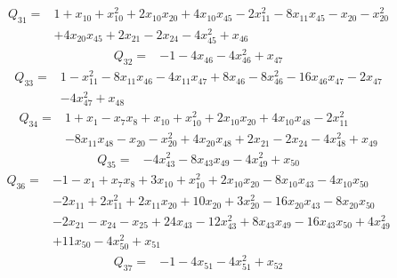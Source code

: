 \begin{equation*}\begin{aligned}
Q_{31}={}& 1+x_{10}+x_{10}^{2}+2x_{10}x_{20}+4x_{10}x_{45}-2x_{11}^{2}-8x_{11}x_{45}-x_{20}-x_{20}^{2}\\
& +4x_{20}x_{45}+2x_{21}-2x_{24}-4x_{45}^{2}+x_{46}
\end{aligned}\end{equation*}
\begin{equation*}\begin{aligned}
Q_{32}={}& -1-4x_{46}-4x_{46}^{2}+x_{47}
\end{aligned}\end{equation*}
\begin{equation*}\begin{aligned}
Q_{33}={}& 1-x_{11}^{2}-8x_{11}x_{46}-4x_{11}x_{47}+8x_{46}-8x_{46}^{2}-16x_{46}x_{47}-2x_{47}\\
& -4x_{47}^{2}+x_{48}
\end{aligned}\end{equation*}
\begin{equation*}\begin{aligned}
Q_{34}={}& 1+x_{1}-x_{7}x_{8}+x_{10}+x_{10}^{2}+2x_{10}x_{20}+4x_{10}x_{48}-2x_{11}^{2}\\
& -8x_{11}x_{48}-x_{20}-x_{20}^{2}+4x_{20}x_{48}+2x_{21}-2x_{24}-4x_{48}^{2}+x_{49}
\end{aligned}\end{equation*}
\begin{equation*}\begin{aligned}
Q_{35}={}& -4x_{43}^{2}-8x_{43}x_{49}-4x_{49}^{2}+x_{50}
\end{aligned}\end{equation*}
\begin{equation*}\begin{aligned}
Q_{36}={}& -1-x_{1}+x_{7}x_{8}+3x_{10}+x_{10}^{2}+2x_{10}x_{20}-8x_{10}x_{43}-4x_{10}x_{50}\\
& -2x_{11}+2x_{11}^{2}+2x_{11}x_{20}+10x_{20}+3x_{20}^{2}-16x_{20}x_{43}-8x_{20}x_{50}\\
& -2x_{21}-x_{24}-x_{25}+24x_{43}-12x_{43}^{2}+8x_{43}x_{49}-16x_{43}x_{50}+4x_{49}^{2}\\
& +11x_{50}-4x_{50}^{2}+x_{51}
\end{aligned}\end{equation*}
\begin{equation*}\begin{aligned}
Q_{37}={}& -1-4x_{51}-4x_{51}^{2}+x_{52}
\end{aligned}\end{equation*}
